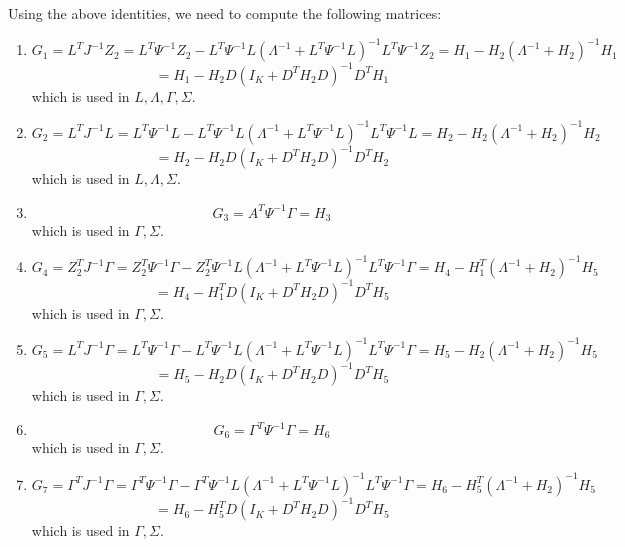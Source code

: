 \documentclass{article}
\begin{document}
Using the above identities, we need to compute the following matrices:
\begin{enumerate}
\item \[
G_1 = L^T J^{-1} Z_2 = L^T \Psi^{-1} Z_2 - L^T \Psi^{-1}L \left( \Lambda^{-1} + L^T \Psi^{-1} L \right)^{-1} L^T \Psi^{-1} Z_2 = H_1 - H_2 \left( \Lambda^{-1} + H_2 \right)^{-1} H_1
\]
\[
= H_1 - H_2 D \left( I_K + D^T H_2 D \right)^{-1}D^T H_1
\]
which is used in $L, \Lambda, \Gamma, \Sigma$.
\item \[
G_2 = L^T J^{-1}L = L^T \Psi^{-1} L - L^T \Psi^{-1}L \left( \Lambda^{-1} + L^T \Psi^{-1} L \right)^{-1} L^T \Psi^{-1} L = H_2 - H_2 \left( \Lambda^{-1} + H_2 \right)^{-1} H_2
\]
\[
= H_2 - H_2 D \left( I_K + D^T H_2 D \right)^{-1}D^T H_2
\]
which is used in $L, \Lambda, \Sigma$.
\item \[
G_3 = A^T \Psi^{-1}\Gamma = H_3
\]
which is used in $\Gamma, \Sigma$.
\item \[
G_4 = Z_2^T J^{-1}\Gamma =Z_2^T \Psi^{-1} \Gamma - Z_2^T \Psi^{-1}L \left( \Lambda^{-1} + L^T \Psi^{-1} L \right)^{-1} L^T \Psi^{-1} \Gamma = H_4 - H_1^T \left( \Lambda^{-1} + H_2 \right)^{-1}H_5
\]
\[
= H_4 - H_1^T D \left( I_K + D^T H_2 D \right)^{-1}D^T H_5
\]
which is used in $\Gamma, \Sigma$.
\item \[
G_5 = L^T J^{-1}\Gamma = L^T \Psi^{-1} \Gamma - L^T \Psi^{-1}L \left( \Lambda^{-1} + L^T \Psi^{-1} L \right)^{-1} L^T \Psi^{-1} \Gamma = H_5 - H_2\left( \Lambda^{-1} + H_2 \right)^{-1} H_5
\]
\[
= H_5 - H_2 D \left( I_K + D^T H_2 D \right)^{-1}D^T H_5 
\]
which is used in $\Gamma, \Sigma$.
\item \[
G_6 = \Gamma^T \Psi^{-1}\Gamma = H_6
\]
which is used in $\Gamma, \Sigma$.
\item \[
G_7 = \Gamma^T J^{-1}\Gamma = \Gamma^T \Psi^{-1} \Gamma - \Gamma^T \Psi^{-1}L \left( \Lambda^{-1} + L^T \Psi^{-1} L \right)^{-1} L^T \Psi^{-1} \Gamma = H_6 - H_5^T\left( \Lambda^{-1} + H_2 \right)^{-1} H_5
\]
\[
= H_6 - H_5^T D \left( I_K + D^T H_2 D \right)^{-1}D^T H_5
\]
which is used in $\Gamma, \Sigma$.
\end{enumerate}
\end{document}
